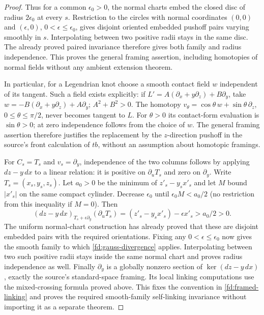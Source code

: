 \begin{proof}
Thus for a common $\epsilon_0>0$, the normal charts embed the
closed disc of radius $2\epsilon_0$ at every $s$. Restriction to
the circles with normal coordinates $(0,0)$ and $(\epsilon,0)$,
$0<\epsilon\leq\epsilon_0$, gives disjoint oriented embedded
pushoff pairs varying smoothly in $s$. Interpolating between two
positive radii stays in the same disc. The already proved paired
invariance therefore gives both family and radius independence.
This proves the general framing assertion, including homotopies
of normal fields without any ambient extension theorem.

In particular, for a Legendrian knot choose a smooth contact field
$w$ independent of its tangent. Such a field exists explicitly:
if $L'=A(\partial_x+y\partial_z)+B\partial_y$, take
$w=-B(\partial_x+y\partial_z)+A\partial_y$; $A^2+B^2>0$.
The homotopy $v_\theta=\cos\theta\,w+\sin\theta\,\partial_z$,
$0\leq\theta\leq\pi/2$, never becomes tangent to $L$.
For $\theta>0$ its contact-form evaluation is $\sin\theta>0$;
at zero independence follows from the choice of $w$.
The general framing assertion therefore justifies the replacement
by the $z$-direction pushoff in the source's front calculation of
$tb$, without an assumption about homotopic framings.

For $C_s=T_s$ and $v_s=\partial_y$, independence of the two
columns follows by applying $dz-y\,dx$ to a linear relation:
it is positive on $\partial_uT_s$ and zero on $\partial_y$.
Write $T_s=(x_s,y_s,z_s)$. Let $a_0>0$ be the minimum of
$z'_s-y_sx'_s$ and let $M$ bound $|x'_s|$ on the same compact
cylinder. Decrease $\epsilon_0$ until
$\epsilon_0M<a_0/2$ (no restriction from this inequality if $M=0$).
Then
\begin{equation}\label{fd:pushoff-positive-clearance}
 (dz-y\,dx)_{T_s+\epsilon\partial_y}
                   (\partial_uT_s)
       =(z'_s-y_sx'_s)-\epsilon x'_s>a_0/2>0.
\end{equation}
The uniform normal-chart construction has already proved that
these are disjoint embedded pairs with the required orientations.
Fixing any $0<\epsilon\leq\epsilon_0$ now gives the smooth family
to which \eqref{fd:gauss-divergence} applies. Interpolating between
two such positive radii stays inside the same normal chart and
proves radius independence as well. Finally $\partial_y$ is a
globally nonzero section of $\ker(dz-y\,dx)$, exactly the source's
standard-space framing. Its local linking computations use the
mixed-crossing formula proved above. This fixes the convention in
\eqref{fd:framed-linking} and proves the required smooth-family
self-linking invariance without importing it as a separate theorem.
\end{proof}

